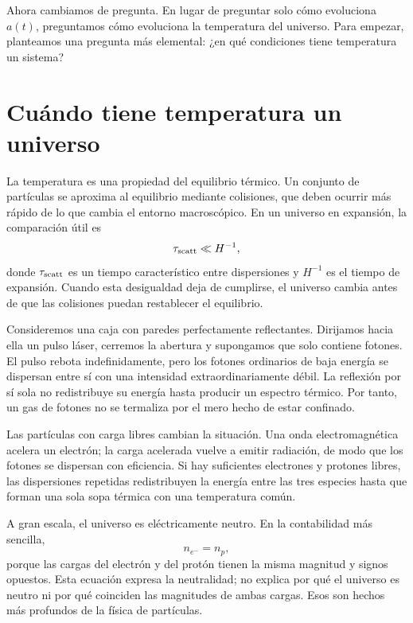 Ahora cambiamos de pregunta. En lugar de preguntar solo cómo evoluciona \(a(t)\), preguntamos cómo evoluciona la temperatura del universo. Para empezar, planteamos una pregunta más elemental: ¿en qué condiciones tiene temperatura un sistema?

\section{Cuándo tiene temperatura un universo}

La temperatura es una propiedad del equilibrio térmico. Un conjunto de partículas se aproxima al equilibrio mediante colisiones, que deben ocurrir más rápido de lo que cambia el entorno macroscópico. En un universo en expansión, la comparación útil es
\begin{equation}
\tau_{\rm scatt}\ll H^{-1},
\label{eq:c07-equilibrium-condition}
\end{equation}
donde \(\tau_{\rm scatt}\) es un tiempo característico entre dispersiones y \(H^{-1}\) es el tiempo de expansión. Cuando esta desigualdad deja de cumplirse, el universo cambia antes de que las colisiones puedan restablecer el equilibrio.

Consideremos una caja con paredes perfectamente reflectantes. Dirijamos hacia ella un pulso láser, cerremos la abertura y supongamos que solo contiene fotones. El pulso rebota indefinidamente, pero los fotones ordinarios de baja energía se dispersan entre sí con una intensidad extraordinariamente débil. La reflexión por sí sola no redistribuye su energía hasta producir un espectro térmico. Por tanto, un gas de fotones no se termaliza por el mero hecho de estar confinado.

Las partículas con carga libres cambian la situación. Una onda electromagnética acelera un electrón; la carga acelerada vuelve a emitir radiación, de modo que los fotones se dispersan con eficiencia. Si hay suficientes electrones y protones libres, las dispersiones repetidas redistribuyen la energía entre las tres especies hasta que forman una sola sopa térmica con una temperatura común.

A gran escala, el universo es eléctricamente neutro. En la contabilidad más sencilla,
\begin{equation}
n_{e^-}=n_p,
\label{eq:c07-neutrality}
\end{equation}
porque las cargas del electrón y del protón tienen la misma magnitud y signos opuestos. Esta ecuación expresa la neutralidad; no explica por qué el universo es neutro ni por qué coinciden las magnitudes de ambas cargas. Esos son hechos más profundos de la física de partículas.

